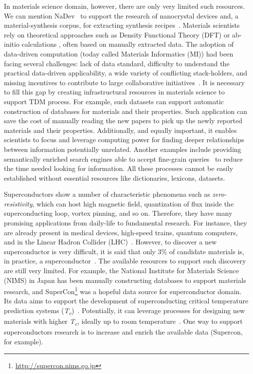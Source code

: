 \documentclass[fleqn,10pt]{wlscirep}
\begin{document}
In materials science domain, however, there are only very limited such resources. We can mention NaDev~\cite{Dieb2016} to support the research of nanocrystal devices and, a material-synthesis corpus, for extracting synthesis recipes~\cite{kononova_text-mined_2019}. Materials scientists rely on theoretical approaches such as Density Functional Theory (DFT) or ab-initio calculations , often based on manually extracted data. 
The adoption of data-driven computation (today called Materials Informatics (MI)) had been facing several challenges: lack of data standard, difficulty to understand the practical data-driven applicability, a wide variety of conflicting stack-holders, and missing incentives to contribute to large collaborative initiatives~\cite{Hill2016MaterialsSW}. It is necessary to fill this gap by creating infrastructural resources in materials science to support TDM process. For example, such datasets can support automatic construction of databases for materials and their properties. Such application can save the cost of manually reading the new papers to pick up the newly reported materials and their properties. Additionally, and equally important, it enables scientists to focus and leverage computing power for finding deeper relationships between information potentially unrelated. Another examples include providing semantically enriched search engines able to accept fine-grain queries~\cite{Liu2019SurfaceMR} to reduce the time needed looking for information. 
All these processes cannot be easily established without essential resources like dictionaries, lexicons, datasets. 

Superconductors show a number of characteristic phenomena such as \textit{zero-resistivity}, which can host high magnetic field, quantization of flux inside the superconducting loop, vortex pinning, and so on.  Therefore, they have many promising applications from daily-life to fundamental research. For instance, they are already present in medical devices, high-speed trains, quantum computers, and in the Linear Hadron Collider (LHC)~\cite{PhilippeBook, Kizu2010ConstructionOT, Cardani2017NewAO}. 
However, to discover a new superconductor is very difficult, it is said that only 3\% of candidate materials is, in practice, a superconductor~\cite{Konno2018DeepLO}.
The available resources to support such discovery are still very limited. For example, the National Institute for Materials Science (NIMS) in Japan has been manually constructing databases to support materials research, and SuperCon\footnote{\url{http://supercon.nims.go.jp}} was a hopeful data source for superconductor domain. 
Its data aims to support the development of  superconducting critical temperature prediction systems (\textit{T\textsubscript{c}})~\cite{stanev2017machine}. Potentially, it can leverage processes for designing new materials with higher \textit{T\textsubscript{c}}, ideally up to room temperature~\cite{Hamlin2019SuperconductivityNR}. One way to support superconductors research is to increase and enrich the available data (Supercon, for example).
\end{document}
